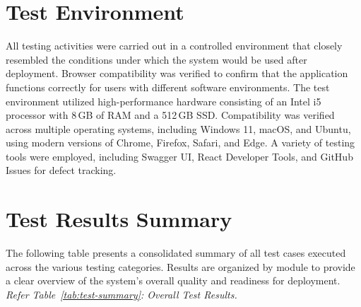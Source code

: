 \section{Test Environment}
\label{sec:test-environment}

All testing activities were carried out in a controlled 
environment that closely resembled the conditions under which 
the system would be used after deployment. Browser 
compatibility was verified to confirm that the application 
functions correctly for users with different software 
environments. The test environment utilized high-performance hardware consisting of an Intel i5 processor with 8\,GB of RAM and a 512\,GB SSD. Compatibility was verified across multiple operating systems, including Windows 11, macOS, and Ubuntu, using modern versions of Chrome, Firefox, Safari, and Edge. A variety of testing tools were employed, including Swagger UI, React Developer Tools, and GitHub Issues for defect tracking.

\section{Test Results Summary}
\label{sec:test-results}

The following table presents a consolidated summary of all test cases executed across the various testing categories. Results are organized by module to provide a clear overview of the system's overall quality and readiness for deployment. \textit{Refer Table~\ref{tab:test-summary}: Overall Test Results.}

